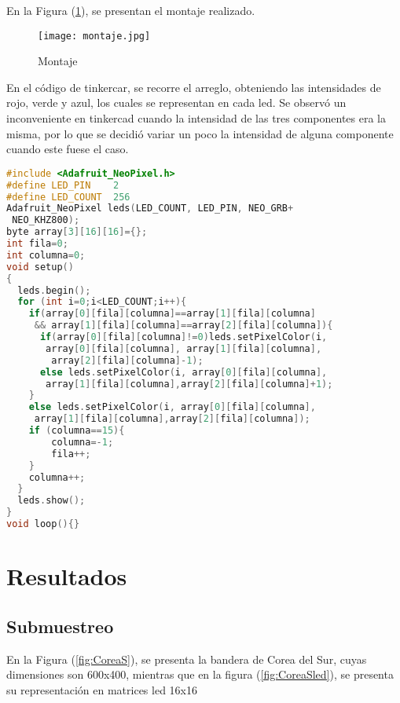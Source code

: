 \documentclass{article}
\begin{document}
En la Figura (\ref{fig:Montaje}), se presentan el montaje realizado.

\begin{figure}[h]
\texttt{[image: montaje.jpg]}
\centering
\caption{Montaje}
\label{fig:Montaje}
\end{figure}

En el código de tinkercar, se recorre el arreglo, obteniendo las intensidades de rojo, verde y azul, los cuales se representan en cada led. Se observó un inconveniente en tinkercad cuando la intensidad de las tres componentes era la misma, por lo que se decidió variar un poco la intensidad de alguna componente cuando este fuese el caso.

\begin{lstlisting}[language=C++, label=tinker]
#include <Adafruit_NeoPixel.h>
#define LED_PIN    2
#define LED_COUNT  256
Adafruit_NeoPixel leds(LED_COUNT, LED_PIN, NEO_GRB+ 
 NEO_KHZ800);
byte array[3][16][16]={};
int fila=0;
int columna=0;
void setup()
{
  leds.begin();
  for (int i=0;i<LED_COUNT;i++){
    if(array[0][fila][columna]==array[1][fila][columna]
     && array[1][fila][columna]==array[2][fila][columna]){
      if(array[0][fila][columna]!=0)leds.setPixelColor(i,
       array[0][fila][columna], array[1][fila][columna],
        array[2][fila][columna]-1);
      else leds.setPixelColor(i, array[0][fila][columna],
       array[1][fila][columna],array[2][fila][columna]+1);
    }
  	else leds.setPixelColor(i, array[0][fila][columna],
  	 array[1][fila][columna],array[2][fila][columna]);
    if (columna==15){
    	columna=-1;
        fila++;
    }
  	columna++;
  }
  leds.show();
}
void loop(){}

\end{lstlisting}

\section{Resultados}\label{resultados}
\subsection{Submuestreo}
En la Figura (\ref{fig:CoreaS}), se presenta la bandera de Corea del Sur, cuyas dimensiones son 600x400, mientras que en la figura (\ref{fig:CoreaSled}), se presenta su representación en matrices led 16x16
\end{document}
